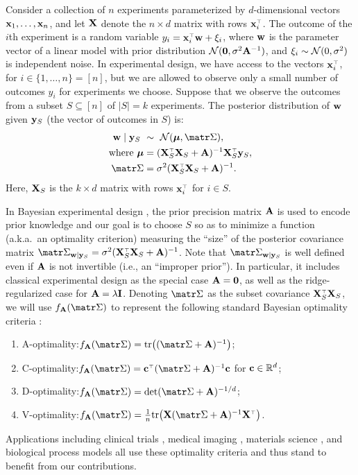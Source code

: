 \documentclass[../../thesis.tex]{subfiles}
\begin{document}
Consider a collection of $n$ experiments parameterized by
$d$-dimensional vectors $\mathbf x_1,\dots,\mathbf x_n$, and let $\mathbf X$ denote the
$n\times d$ matrix with rows $\x_i^\top$. The outcome of the $i$th
experiment is a random variable $y_i = \x_i^\top\w + \xi_i$, where
$\mathbf w$ is the parameter vector of a linear model with prior distribution
$\mathcal{N}(\mathbf 0,\sigma^2\mathbf A^{-1})$, and $\xi_i\sim \mathcal{N}(0,\sigma^2)$ is
independent noise. In experimental design, we have access to the vectors
$\x_i^\top$, for $i\in\{1,\ldots,n\} = [n]$, but we are allowed to
observe only a small number of outcomes $y_i$ for experiments we choose.
Suppose that we observe the outcomes from a subset
$S\subseteq [n]$ of $\lvert S \vert = k$ experiments. The
posterior distribution of $\mathbf w$ given $\mathbf y_S$ (the vector of outcomes in $S$) is:
\begin{align*}
  \w\mid \y_S \      & \sim\ \Nc(\mub, \Sigmab),                 \\
  \text{where } \mub & = (\X_S^\top\X_S + \A)^{-1}\X_S^\top\y_S, \\
  \Sigmab            & = \sigma^2(\X_S^\top\X_S+\A)^{-1}.
\end{align*}
Here, $\mathbf X_S$ is the $k\times d$ matrix with rows $\x_i^\top$ for
$i\in S$.

In Bayesian experimental design \citep{bayesian-design-review},
the prior precision matrix $\mathbf A$ is used to encode prior knowledge
and our goal is to choose $S$ so as to
minimize a function (a.k.a.~an optimality criterion) measuring the ``size''
of the posterior covariance matrix
$\Sigmab_{\w\mid\y_S} = \sigma^2(\X_S^\top\X_S+\A)^{-1}$.
Note that $\Sigmab_{\w\mid\y_S}$ is well defined even if $\mathbf A$ is not
invertible (i.e., an ``improper prior''). In particular, it includes classical
experimental design as the special case $\mathbf A = \mathbf 0$, as well as
the ridge-regularized case for $\mathbf A=\lambda\mathbf I$.
Denoting $\Sigmab$ as the subset covariance $\X_S^\top\X_S$, we will
use $f_{\A}(\Sigmab)$ to represent the following standard Bayesian
optimality criteria \citep{bayesian-design-review,optimal-design-pukelsheim}:
\begin{enumerate}
  \item A-optimality:\quad $f_{\A}(\Sigmab) = \tr\big((\Sigmab+\A)^{-1}\big)$;
  \item C-optimality:\quad \!\!$f_{\A}(\Sigmab) = \cb^\top(\Sigmab+\A)^{-1}\cb$ for
        $\mathbf{c} \in \mathbb R^d$;
  \item D-optimality:\quad $f_{\A}(\Sigmab) = \det(\Sigmab+\A)^{-1/d}$;
  \item V-optimality:\quad $f_{\A}(\Sigmab) =
          \frac1n\tr\big(\X(\Sigmab+\A)^{-1}\X^\top\big)$.
\end{enumerate}
Applications including clinical trials
\citep{ryan2015fully,ding2008bayesian,spiegelhalter2004incorporating,berry2002adaptive,stangl1998bayesian,flournoy1993clinical},
medical imaging \citep{owen2016optimisation},
materials science
\citep{frazier2016bayesian,ueno2016combo,terejanu2012bayesian},
and biological process models \citep{ryan2016optimal}
all use these optimality criteria and thus stand to benefit from
our contributions.
\end{document}
